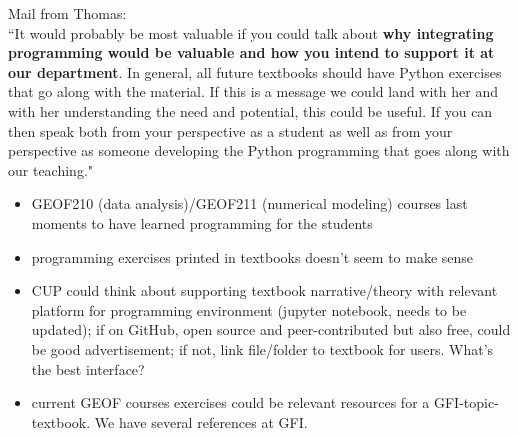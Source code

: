 \documentclass{article}
\begin{document}
Mail from Thomas:\\
\indent
``It would probably be most valuable if you could talk about \textbf{why integrating programming would be valuable and how you intend to support it at our department}. In general, all future textbooks should have Python exercises that go along with the material. If this is a message we could land with her and with her understanding the need and potential, this could be useful.
If you can then speak both from your perspective as a student as well as from your perspective as someone developing the Python programming that goes along with our teaching."

\begin{itemize}
    \item GEOF210 (data analysis)/GEOF211 (numerical modeling) courses last moments to have learned programming for the students
    \item programming exercises printed in textbooks doesn't seem to make sense
    \item CUP could think about supporting textbook narrative/theory with relevant platform for programming environment (jupyter notebook, needs to be updated); if on GitHub, open source and peer-contributed but also free, could be good advertisement; if not, link file/folder to textbook for users. What's the best interface?
    \item current GEOF courses exercises could be relevant resources for a GFI-topic-textbook. We have several references at GFI.
\end{itemize}
\end{document}
